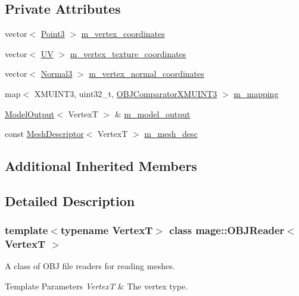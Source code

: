 \subsection*{Private Attributes}
\begin{DoxyCompactItemize}
\item 
vector$<$ \hyperlink{structmage_1_1_point3}{Point3} $>$ \hyperlink{classmage_1_1_o_b_j_reader_a1032eb4a6844a99f1d96fc17c3e52aee}{m\+\_\+vertex\+\_\+coordinates}
\item 
vector$<$ \hyperlink{structmage_1_1_u_v}{UV} $>$ \hyperlink{classmage_1_1_o_b_j_reader_aec7c093d380be0b8506f7b8fdf9c3ad1}{m\+\_\+vertex\+\_\+texture\+\_\+coordinates}
\item 
vector$<$ \hyperlink{structmage_1_1_normal3}{Normal3} $>$ \hyperlink{classmage_1_1_o_b_j_reader_a765e87afe7bd138dadcfc8c194311ed3}{m\+\_\+vertex\+\_\+normal\+\_\+coordinates}
\item 
map$<$ X\+M\+U\+I\+N\+T3, uint32\+\_\+t, \hyperlink{structmage_1_1_o_b_j_reader_1_1_o_b_j_comparator_x_m_u_i_n_t3}{O\+B\+J\+Comparator\+X\+M\+U\+I\+N\+T3} $>$ \hyperlink{classmage_1_1_o_b_j_reader_a3783d5387bcba3d593437f9e2c350387}{m\+\_\+mapping}
\item 
\hyperlink{structmage_1_1_model_output}{Model\+Output}$<$ VertexT $>$ \& \hyperlink{classmage_1_1_o_b_j_reader_ad4691c59a3e3ecefd201a8f03528bbd8}{m\+\_\+model\+\_\+output}
\item 
const \hyperlink{structmage_1_1_mesh_descriptor}{Mesh\+Descriptor}$<$ VertexT $>$ \hyperlink{classmage_1_1_o_b_j_reader_a4b5810a694e2223de437e62bba748bc8}{m\+\_\+mesh\+\_\+desc}
\end{DoxyCompactItemize}
\subsection*{Additional Inherited Members}


\subsection{Detailed Description}
\subsubsection*{template$<$typename VertexT$>$\newline
class mage\+::\+O\+B\+J\+Reader$<$ Vertex\+T $>$}

A class of O\+BJ file readers for reading meshes.


\begin{DoxyTemplParams}{Template Parameters}
{\em VertexT} & The vertex type. \\
\hline
\end{DoxyTemplParams}



